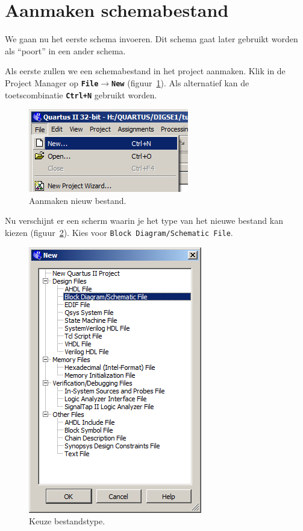 \documentclass[a4paper,12pt,fleqn,twoside]{book}
\def\tutpicscale{0.455}
\newcommand{\menu}[1]{\texttt{\textbf{#1}}}
\newcommand{\knop}[1]{\texttt{\textbf{#1}}}
\newcommand{\naam}[1]{\texttt{#1}}
\def\pijl{$\rightarrow$}%
\begin{document}
\section{Aanmaken schemabestand}
\label{sec:aanmakenschemabestand}
We gaan nu het eerste schema invoeren. Dit schema gaat later gebruikt worden
als ``poort'' in een ander schema. 
 
Als eerste zullen we een schemabestand in het project aanmaken. Klik in de
Project Manager op \menu{File\pijl{}New} (figuur~\ref{fig:015createnewfile}).
Als alternatief kan de toetscombinatie \knop{Ctrl+N} gebruikt worden. 

\begin{figure}[H]
\centering
\includegraphics[scale=\tutpicscale]{015createnewfile}
\caption{Aanmaken nieuw bestand.}
\label{fig:015createnewfile}
\end{figure}

Nu verschijnt er een scherm waarin je het type van het nieuwe bestand kan
kiezen (figuur~\ref{fig:016selectblockschematic}). Kies voor
\naam{Block Diagram/Schematic File}.
 
\begin{figure}[H]
\centering
\includegraphics[scale=\tutpicscale]{016selectblockschematic}
\caption{Keuze bestandstype.}
\label{fig:016selectblockschematic}
\end{figure}
\end{document}
